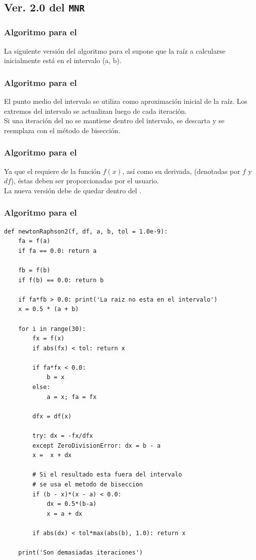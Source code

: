 \documentclass[12pt]{beamer}
\begin{document}
\subsection{Ver. 2.0 del \texttt{MNR}}

\begin{frame}
\frametitle{Algoritmo para el }
La siguiente versión del algoritmo para el  supone que la raíz a calcularse inicialmente está en el intervalo (a, b).
\end{frame}
\begin{frame}
\frametitle{Algoritmo para el }
El punto medio del intervalo se utiliza como aproximación inicial de la raíz. \pause Los extremos del intervalo se actualizan luego de cada iteración.
\\
\bigskip
\pause
Si una iteración del  no se mantiene dentro del intervalo, se descarta y se reemplaza con el método de bisección.
\end{frame}
\begin{frame}
\frametitle{Algoritmo para el }
Ya que el  requiere de la función $ f(x)$, así como su derivada, (denotadas por $f$ y $df$), \pause éstas deben ser proporcionadas por el usuario.
\\
\bigskip
\pause
La nueva versión debe de quedar dentro del .
\end{frame}
\begin{frame}
\frametitle{Algoritmo para el }
\begin{lstlisting}[caption=Código para la segunda versión del MNR]
def newtonRaphson2(f, df, a, b, tol = 1.0e-9):
    fa = f(a)
    if fa == 0.0: return a

    fb = f(b)
    if f(b) == 0.0: return b

    if fa*fb > 0.0: print('La raiz no esta en el intervalo')
    x = 0.5 * (a + b)

    for i in range(30):
        fx = f(x)
        if abs(fx) < tol: return x

        if fa*fx < 0.0:
            b = x
        else:
            a = x; fa = fx

        dfx = df(x)
        
        try: dx = -fx/dfx
        except ZeroDivisionError: dx = b - a
        x =  x + dx
        
        # Si el resultado esta fuera del intervalo
        # se usa el metodo de biseccion
        if (b - x)*(x - a) < 0.0:
            dx = 0.5*(b-a)
            x = a + dx
        
        if abs(dx) < tol*max(abs(b), 1.0): return x
    
    print('Son demasiadas iteraciones')
\end{lstlisting}
\end{frame}
\end{document}
